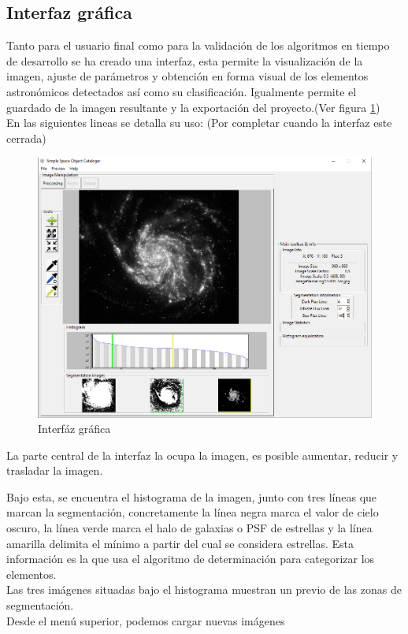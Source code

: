 	\subsection{Interfaz gráfica}
	Tanto para el usuario final como para la validación de los algoritmos en tiempo de desarrollo se ha creado una interfaz, esta permite la visualización de la imagen, ajuste de parámetros y obtención en forma visual de los elementos astronómicos detectados así como su clasificación. Igualmente permite el guardado de la imagen resultante y la exportación del proyecto.(Ver figura \ref{fig:GUI_limpia})\\
	En las siguientes lineas se detalla su uso: (Por completar cuando la interfaz este cerrada)\\
	\begin{figure}[!htb]
		\centering
		\includegraphics[width=1\textwidth]{images/GUI.jpg}
		\caption{\label{fig:GUI_limpia}Interfáz gráfica}
	\end{figure}
	La parte central de la interfaz la ocupa la imagen, es posible aumentar, reducir y trasladar la imagen.
	
	Bajo esta, se encuentra el histograma de la imagen, junto con tres líneas que marcan la segmentación, concretamente la línea negra marca el valor de cielo oscuro, la línea verde marca el halo de galaxias o PSF de estrellas y la línea amarilla delimita el mínimo a partir del cual se considera estrellas. Esta información es la que usa el algoritmo de determinación para categorizar los elementos.\\
	Las tres imágenes situadas bajo el histograma muestran un previo de las zonas de segmentación.\\	
	Desde el menú superior, podemos cargar nuevas imágenes
